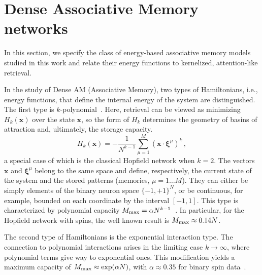 \documentclass{article}
\theoremstyle{plain}
\theoremstyle{definition}
\theoremstyle{remark}
\begin{document}
\section{Dense Associative Memory networks}\label{sec:dam}

In this section, we specify the class of energy-based associative memory models studied in this work and relate their energy functions to kernelized, attention-like retrieval.

In the study of Dense AM (Associative Memory), two types of Hamiltonians, i.e., energy functions, that define the internal energy of the system are distinguished.  The first type is $k$-polynomial~\cite{krotov2016dense}. Here, retrieval can be viewed as minimizing $H_k(\bm{x})$ over the state $\bm{x}$, so the form of $H_k$ determines the geometry of basins of attraction and, ultimately, the storage capacity.
\begin{equation}
    H_k(\bm{x}) = - \frac{1}{N^{k-1}} \sum\limits_{\mu=1}^{M} (\bm{x} \cdot \bm{\xi}^\mu)^k\,,
    \label{eq:H_k}
\end{equation}
a special case of which is the classical Hopfield network \cite{Hopfield1982} when $k=2$. 
The vectors $\bm{x}$ and $\bm{\xi}^\mu$ belong to the same space and define, respectively, the current state of the system and the stored patterns (memories, $\mu=1\dots M$). They can either be simply elements of the binary neuron space $\{-1,+1\}^N$, or be continuous, for example, bounded on each coordinate by the interval $[-1, 1]$. This type is characterized by polynomial capacity $M_{\rm max} = \alpha N^{k-1}$~\cite{krotov2016dense}. In particular, for the Hopfield network with spins, the well known result is $M_{\rm max} \approx 0.14N$.

The second type of Hamiltonians is the exponential interaction type. The connection to polynomial interactions arises in the limiting case $k \to \infty$, where polynomial terms give way to exponential ones. This modification yields a maximum capacity of $M_{\rm max} \approx \exp(\alpha N)$, with $\alpha \approx 0.35$ for binary spin data~\cite{demircigil2017model}.
\end{document}
